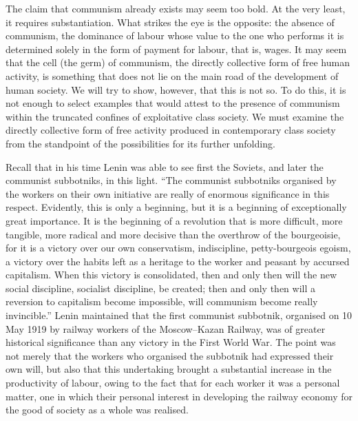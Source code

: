 \documentclass[12pt,a4paper,openany]{book}
\begin{document}
The claim that communism already exists may seem too bold. At the very least, it requires substantiation. What strikes the eye is the opposite: the absence of communism, the dominance of labour whose value to the one who performs it is determined solely in the form of payment for labour, that is, wages. It may seem that the cell (the germ) of communism, the directly collective form of free human activity, is something that does not lie on the main road of the development of human society. We will try to show, however, that this is not so. To do this, it is not enough to select examples that would attest to the presence of communism within the truncated confines of exploitative class society. We must examine the directly collective form of free activity produced in contemporary class society from the standpoint of the possibilities for its further unfolding.

Recall that in his time Lenin was able to see first the Soviets, and later the communist subbotniks, in this light. “The communist subbotniks organised by the workers on their own initiative are really of enormous significance in this respect. Evidently, this is only a beginning, but it is a beginning of exceptionally great importance. It is the beginning of a revolution that is more difficult, more tangible, more radical and more decisive than the overthrow of the bourgeoisie, for it is a victory over our own conservatism, indiscipline, petty-bourgeois egoism, a victory over the habits left as a heritage to the worker and peasant by accursed capitalism. When this victory is consolidated, then and only then will the new social discipline, socialist discipline, be created; then and only then will a reversion to capitalism become impossible, will communism become really invincible.” Lenin maintained that the first communist subbotnik, organised on 10 May 1919 by railway workers of the Moscow–Kazan Railway, was of greater historical significance than any victory in the First World War. The point was not merely that the workers who organised the subbotnik had expressed their own will, but also that this undertaking brought a substantial increase in the productivity of labour, owing to the fact that for each worker it was a personal matter, one in which their personal interest in developing the railway economy for the good of society as a whole was realised.
\end{document}
